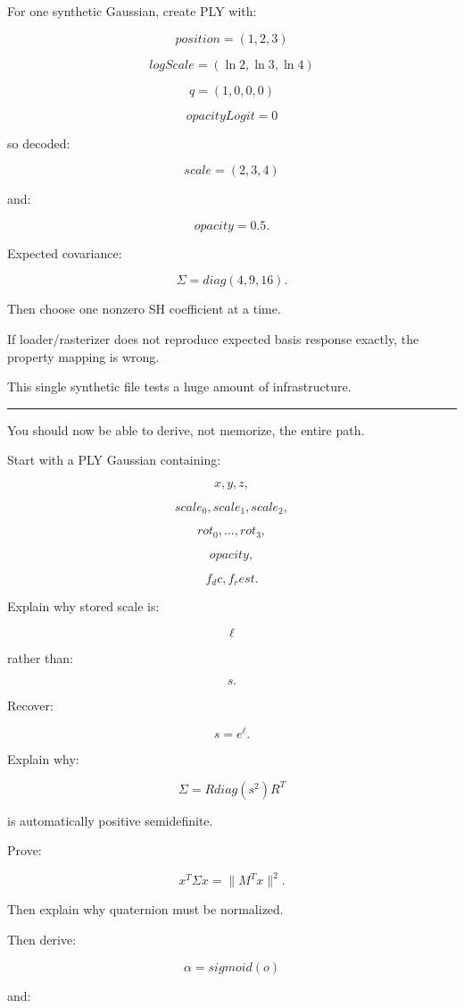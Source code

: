 For one synthetic Gaussian, create PLY with:

\[
position=(1,2,3)
\]

\[
logScale=(\ln2,\ln3,\ln4)
\]

\[
q=(1,0,0,0)
\]

\[
opacityLogit=0
\]

so decoded:

\[
scale=(2,3,4)
\]

and:

\[
opacity=0.5.
\]

Expected covariance:

\[
\Sigma=
diag(
4,9,16
).
\]

Then choose one nonzero SH coefficient at a time.

If loader/rasterizer does not reproduce expected basis response exactly, the property mapping is wrong.

This single synthetic file tests a huge amount of infrastructure.

\begin{center}\rule{0.5\linewidth}{0.5pt}\end{center}

You should now be able to derive, not memorize, the entire path.

Start with a PLY Gaussian containing:

\[
x,y,z,
\]

\[
scale_0,scale_1,scale_2,
\]

\[
rot_0,\dots,rot_3,
\]

\[
opacity,
\]

\[
f_dc,
f_rest.
\]

Explain why stored scale is:

\[
\ell
\]

rather than:

\[
s.
\]

Recover:

\[
s=e^\ell.
\]

Explain why:

\[
\Sigma
=
Rdiag(s^2)R^T
\]

is automatically positive semidefinite.

Prove:

\[
x^T\Sigma x
=
\|M^Tx\|^2.
\]

Then explain why quaternion must be normalized.

Then derive:

\[
\alpha=sigmoid(o)
\]

and:

